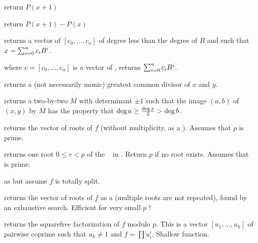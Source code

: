 


 return $P(x+1)$

 return $P(x+1)-P(x)$

 returns a vector of 
$[c_0,\ldots,c_n]$ of degree less than the degree of $B$ and such that
$x=\sum_{i=0}^{n}{c_i\*B^i}$.

 where $v=[c_0,\ldots,c_n]$
is a vector of , returns $\sum_{i=0}^{n}{c_i\*B^i}$.



 returns a (not necessarily monic)
greatest common divisor of $x$  and $y$.

 returns a two-by-two 
$M$ with determinant $\pm 1$ such that the image $(a,b)$ of $(x,y)$ by $M$
has the property that $\deg a \geq {\deg x \over 2} > \deg b$.


 returns the vector of roots
of $f$ (without multiplicity, as a ). Assumes that $p$ is
prime.

 returns one root $0 \leq r < p$ of
the ~ in . Return $p$ if no root exists. Assumes
that  is prime.

 as  but
assume $f$ is totally split.

 returns the vector of roots
of $f$ as a  (multiple roots are not repeated), found
by an exhaustive search. Efficient for very small $p$ !


 returns the squarefree
factorization of $f$ modulo $p$. This is a vector $[u_1,\dots,u_k]$
of pairwise coprime  such that $u_k \neq 1$ and $f = \prod u_i^i$.
Shallow function.

